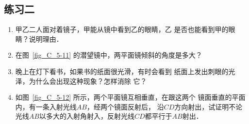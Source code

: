 \subsection*{练习二}
\begin{enumerate}
    \item 甲乙二人面对着镜子，甲能从镜中看到乙的眼睛，乙
    是否也能看到甲的眼睛？说明理由．
    \item 在图~\ref{fig_C_5-11} 的潜望镜中，两平面镜倾斜的角度是多大？
    \item 晚上在灯下看书，如果书的纸面很光滑，有时会看到
    纸面上发出刺眼的光泽，为什么会出现这种现象？怎样消除
    它？
    \item 如图~\ref{fig_C_5-12} 所示，两个平面镜互相垂直，在跟这两个
    镜面垂直的平面内，有一条入射光线$AB$，经两个镜面反射后，
    沿$CD$方向射出，试证明不论光线$AB$以多大的入射角射入，反射光线$CD$都平行于$AB$射出．
    

\end{enumerate}
